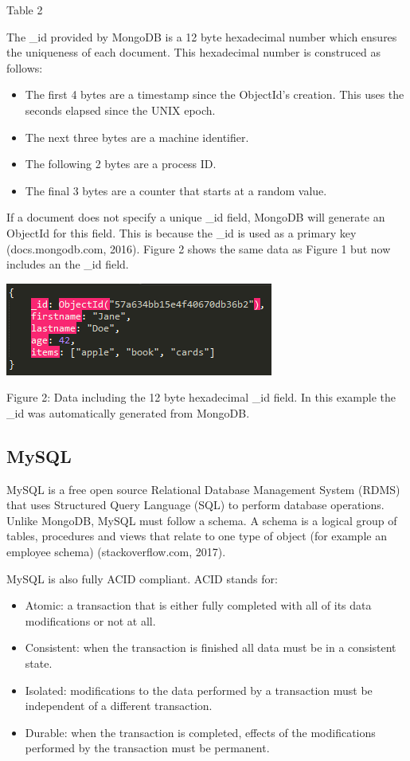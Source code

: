 \documentclass[12pt]{article}
\begin{document}
\begin{center}
Table 2
\end{center}

The {\_}id provided by MongoDB is a 12 byte hexadecimal number which ensures the uniqueness of each document. This hexadecimal number is construced as follows:

\begin{itemize}
	\item The first 4 bytes are a timestamp since the ObjectId's creation. This uses the seconds elapsed since the UNIX epoch.
	\item The next three bytes are a machine identifier.
	\item The following 2 bytes are a process ID.
	\item The final 3 bytes are a counter that starts at a random value.
\end{itemize}

If a document does not specify a unique {\_}id field, MongoDB will generate an ObjectId for this field. This is because the {\_}id is used as a primary key (docs.mongodb.com, 2016). Figure 2 shows the same data as Figure 1 but now includes an the {\_}id field. 

\begin{center}
	\includegraphics[scale=1]{json_id.PNG}
	
	Figure 2: Data including the 12 byte hexadecimal {\_}id field. In this example the {\_}id was automatically generated from MongoDB. 
\end{center}

\subsection{MySQL}
MySQL is a free open source Relational Database Management System (RDMS) that uses Structured Query Language (SQL) to perform database operations. Unlike MongoDB, MySQL must follow a schema. A schema is a logical group of tables, procedures and views that relate to one type of object (for example an employee schema) (stackoverflow.com, 2017).

MySQL is also fully ACID compliant. ACID stands for: 
\begin{itemize}
	\item Atomic: a transaction that is either fully completed with all of its data modifications or not at all.
	\item Consistent: when the transaction is finished all data must be in a consistent state.
	\item Isolated: modifications to the  data performed by a transaction must be independent of a different transaction.
	\item Durable: when the transaction is completed, effects of the modifications performed by the transaction must be permanent.
\end{itemize}
\end{document}
